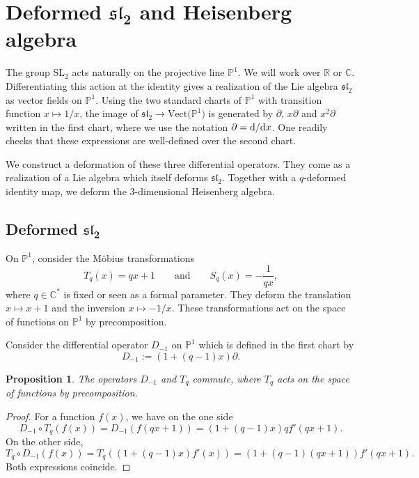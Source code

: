 \documentclass[pdftex]{sigma}
\numberwithin{equation}{section}
\newtheorem{Proposition}[Theorem]{Proposition}
 { \theoremstyle{definition}
\newtheorem{Definition}[Theorem]{Definition}
\newtheorem{Note}[Theorem]{Note}
\newtheorem{Example}[Theorem]{Example}
\newtheorem{Remark}[Theorem]{Remark} }
\newcommand*{\R}{\mathbb{R}}
\newcommand*{\C}{\mathbb{C}}
\begin{document}
\section[Deformed sl\_2 and Heisenberg algebra]{Deformed $\boldsymbol{\mathfrak{sl}_2}$ and Heisenberg algebra}\label{Sec:sl2}

The group $\mathrm{SL}_2$ acts naturally on the projective line $\mathbb{P}^1$. We will work over $\R$ or $\C$. Differentiating this action at the identity gives a realization of the Lie algebra $\mathfrak{sl}_2$ as vector fields on $\mathbb{P}^1$.
Using the two standard charts of $\mathbb{P}^1$ with transition function $x\mapsto 1/x$, the image of $\mathfrak{sl}_2\to \mathrm{Vect}\big(\mathbb{P}^1\big)$ is generated by $\partial$, $x\partial$ and $x^2\partial$ written in the first chart, where we use the notation $\partial={\rm d}/{\rm d}x$. One readily checks that these expressions are well-defined over the second chart.

We construct a deformation of these three differential operators. They come as a realization of a Lie algebra which itself deforms $\mathfrak{sl}_2$. Together with a $q$-deformed identity map, we deform the 3-dimensional Heisenberg algebra.


\subsection[Deformed sl\_2]{Deformed $\boldsymbol{\mathfrak{sl}_2}$}
On $\mathbb{P}^1$, consider the M\"obius transformations
\[
T_q(x)=qx+1 \qquad \text{and}\qquad S_q(x)=-\frac{1}{qx},
\]
where $q\in \C^*$ is fixed or seen as a formal parameter.
They deform the translation $x\mapsto x+1$ and the inversion $x\mapsto -1/x$. These transformations act on the space of functions on $\mathbb{P}^1$ by precomposition.

Consider the differential operator $D_{-1}$ on $\mathbb{P}^1$ which is defined in the first chart by
\[%
D_{-1}:=(1+(q-1)x)\partial.
\]

\begin{Proposition}\label{Prop:commute-T_q}
The operators $D_{-1}$ and $T_q$ commute, where $T_q$ acts on the space of functions by precomposition.
\end{Proposition}
\begin{proof}
For a function $f(x)$, we have on the one side
\[
D_{-1}\circ T_q(f(x))=D_{-1}(f(qx+1)) = (1+(q-1)x)qf'(qx+1).
\]
On the other side,
\[
T_q\circ D_{-1}(f(x))=T_q((1+(q-1)x)f'(x)) = (1+(q-1)(qx+1))f'(qx+1).
\]
Both expressions coincide.
\end{proof}
\end{document}
